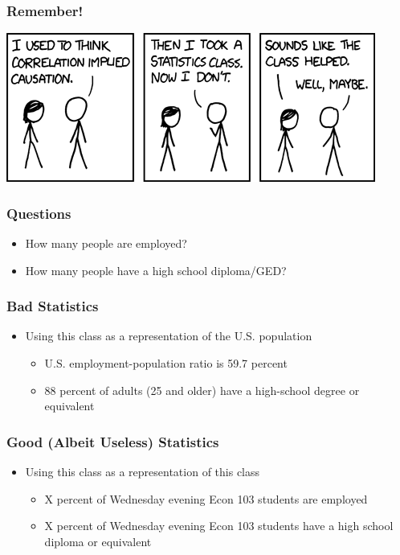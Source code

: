 \documentclass{beamer}
\begin{document}
\begin{frame}
	\frametitle{Remember!}
	\begin{center}
		\includegraphics[scale=0.75]{./images/xkcd_correlation.png}
	\end{center}
\end{frame}

\begin{frame}
\frametitle{Questions}
	\begin{itemize}[<+- | alert@+>]
		\item How many people are employed?
		\item How many people have a high school diploma/GED?
	\end{itemize}
\end{frame}

\begin{frame}
\frametitle{Bad Statistics}
	\begin{itemize}
		\item Using this class as a representation of the U.S. population
		\begin{itemize}
			\item U.S. employment-population ratio is 59.7 percent
			\item 88 percent of adults (25 and older) have a high-school degree or equivalent
		\end{itemize}
	\end{itemize}
\end{frame}

\begin{frame}
\frametitle{Good (Albeit Useless) Statistics}
	\begin{itemize}
		\item Using this class as a representation of this class
		\begin{itemize}
			\item X percent of Wednesday evening Econ 103 students are employed
			\item X percent of Wednesday evening Econ 103 students have a high school diploma 				or equivalent
		\end{itemize}
	\end{itemize}
\end{frame}
\end{document}
